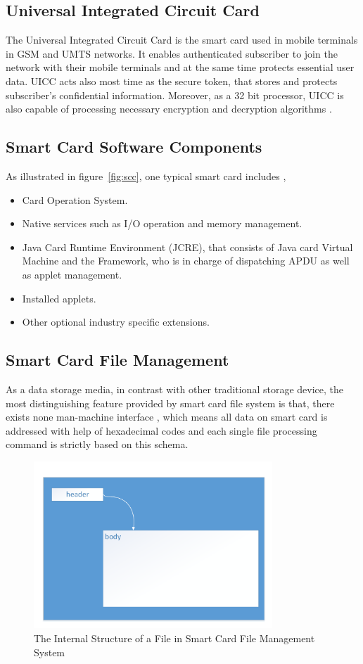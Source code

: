 \subsection{Universal Integrated Circuit Card}
The Universal Integrated Circuit Card is the smart card used in mobile terminals in GSM and UMTS networks. It enables authenticated subscriber to join the network with their mobile terminals and at the same time protects essential user data. UICC acts  also most time as the secure token, that stores and protects subscriber's confidential information. Moreover, as a 32 bit processor, UICC is also capable of processing necessary  encryption and  decryption algorithms \cite{uiccDef}.

\subsection{Smart Card Software Components}
As illustrated in figure~\ref{fig:scc}, one typical smart card includes \cite{jcadg},
\begin{itemize}
\item Card Operation System.
\item Native services such as I/O operation and memory management.
\item Java Card Runtime Environment (JCRE), that consists of Java card Virtual Machine and the Framework, who is in charge of dispatching APDU as well as applet management.
\item Installed applets. 
\item Other optional industry specific extensions.
\end{itemize}

\subsection{Smart Card File Management}
As a data storage media, in contrast with other traditional storage device, the most distinguishing feature provided by smart card file system is that, there exists none man-machine interface \cite{handbuch}, which means all data on smart card is addressed with help of hexadecimal codes and each single file processing command is strictly based on this schema.

\begin{figure}[!htbp]
	\centering
	\includegraphics[width=0.8\textwidth]{file}
		\caption{The Internal Structure of a File in Smart Card File Management System \cite{handbuch}}
	\label{fig:file}
\end{figure}

